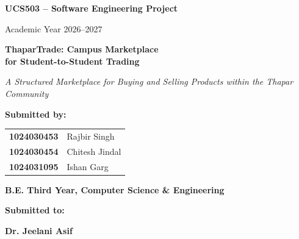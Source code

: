 \documentclass[12pt,a4paper,oneside]{report}
\begin{document}

\begin{titlepage}

\centering

\vspace*{0.5cm}

{\Large\bfseries UCS503 -- Software Engineering Project}

\vspace{0.3cm}

{\large Academic Year 2026--2027}

\vspace{1.5cm}

{\Huge\bfseries
ThaparTrade: Campus Marketplace\\
for Student-to-Student Trading
}

\vspace{0.4cm}

{\large\itshape
A Structured Marketplace for Buying and Selling Products within the
Thapar Community
}

\vspace{2cm}

{\large\textbf{Submitted by:}}

\vspace{0.3cm}

\begin{tabular}{ll}

\textbf{1024030453} & Rajbir Singh \\

\textbf{1024030454} & Chitesh Jindal \\

\textbf{1024031095} & Ishan Garg \\

\end{tabular}

\vspace{0.5cm}

{\normalsize\textbf{B.E. Third Year, Computer Science \& Engineering}}

\vspace{1.6cm}

{\large\textbf{Submitted to:}}

\vspace{0.2cm}

{\large\textbf{Dr. Jeelani Asif}}

\vspace{0.1cm}


\end{titlepage}
\end{document}
